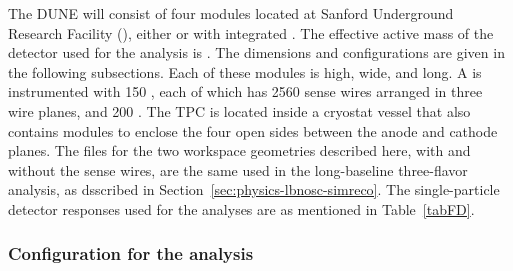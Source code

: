 The DUNE  will consist of four \nominalmodsize \lartpc modules located at Sanford Underground Research Facility (\surf), %
either  or  with integrated  .  
The effective active mass of the detector used for the analysis is \fdfiducialmass. The  dimensions and   configurations are given in the following subsections.
Each of these modules is \tpcheight high, \cryostatwdth wide, and \cryostatlen long. A \single {} is instrumented with 150 , each of which has 2560 sense wires
arranged in three wire planes, and 200 . The TPC is located inside a cryostat vessel that also contains  modules to enclose the four open sides between the anode and cathode planes. %
The  files for the two   workspace geometries described here, with and without the 
sense wires, are the same used in the long-baseline three-flavor analysis, as dsscribed in Section~\ref{sec:physics-lbnosc-simreco}.
The single-particle detector responses used for the analyses are as mentioned in Table~\ref{tabFD}.
\begin{table}[h]
    \begin{center}
        \end{center}
        \caption{\label{tabFD}FD properties used for the analyses. }
    \end{table} 
    
 \subsubsection{  Configuration for the  analysis}
 
